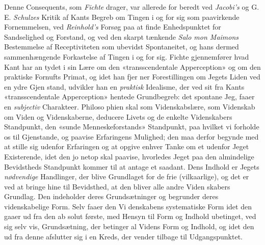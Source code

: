 \documentclass[12pt,a4paper]{book}
\begin{document}
Denne Consequents, som \emph{Fichte} drager, var allerede for\-%
beredt ved \emph{Jacobi's} og G. E. \emph{Schulzes} Kritik af Kants
Begreb om Tingen i og for sig som paavirkende Fornemmelsen,
ved \emph{Reinhold's} Forsøg paa at finde Enhedspunktet for
Sandselighed og Forstand, og ved den skarpt tænkende \emph{Salo\-%
mon Maimons} Bestemmelse af Receptiviteten som ubevidst
Spontaneitet, og hans dermed sammenhængende Forkastelse af
Tingen i og for sig. Fichte gjennemfører hvad Kant har an\-%
tydet i sin Lære om den «transscendentale Apperception»
og om den praktiske Fornufts Primat, og idet han fjer\-%
ner Forestillingen om Jegets Liden ved en ydre Gjen\-%
stand, udvikler han en \emph{praktisk} Idealisme, der ved sit fra
Kants «transscendentale Apperception» hentede Grundbegreb:
det spontane Jeg, faaer en \emph{subjectiv} Charakteer. Philoso\-%
phien skal som Videnskabslære, som Videnskab om Viden og
Videnskaberne, deducere Livets og de enkelte Videnskabers
Standpunkt, den «sunde Menneskeforstands» Standpunkt, paa
hvilket vi forholde os til Gjenstande, og paavise Erfaringens
Mulighed; den maa derfor begynde med at stille sig udenfor
Erfaringen og at opgive enhver Tanke om et udenfor Jeget
Existerende, idet den jo netop skal paavise, hvorledes Jeget paa
den almindelige Bevidstheds Standpunkt kommer til at antage
et saadant. Dens Indhold er Jegets \emph{nødvendige} Handlinger,
der blive Grundlaget for de frie (vilkaarlige), og det er ved at
bringe hine til Bevidsthed, at den bliver alle andre Viden\-%
skabers Grundlag. Den indeholder deres Grundsætninger og
begrunder deres videnskabelige Form. Selv faaer den Vi\-%
denskabens systematiske Form idet den gaaer ud fra den ab\-%
solut første, med Hensyn til Form og Indhold ubetinget, ved
sig selv vis, Grundsætning, der betinger al Videns Form og
Indhold, og idet den ud fra denne afslutter sig i en Kreds,
der vender tilbage til Udgangspunktet.
\end{document}
